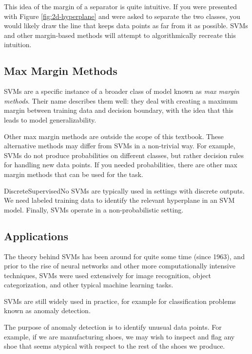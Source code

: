 This idea of the margin of a separator is quite intuitive. If you were presented with Figure \ref{fig:2d-hyperplane} and were asked to separate the two classes, you would likely draw the line that keeps data points as far from it as possible. SVMs and other margin-based methods will attempt to algorithmically recreate this intuition.

\subsection{Max Margin Methods}
SVMs are a specific instance of a broader class of model known as \textit{max margin methods}. Their name describes them well: they deal with creating a maximum margin between training data and decision boundary, with the idea that this leads to model generalizability. 

Other max margin methods are outside the scope of this textbook. These alternative methods may differ from SVMs in a non-trivial way. For example, SVMs do not produce probabilities  on different classes, but rather decision rules for handling new data points. If you needed probabilities, there are other max margin methods that can be used for the task.
%
\begin{mlcube}{Discrete}{Supervised}{No}
SVMs are typically used in settings with discrete outputs. We need labeled training data to identify the relevant hyperplane in an SVM model. Finally, SVMs operate in a non-probabilistic setting.
\end{mlcube}

\subsection{Applications}
The theory behind SVMs has been around for quite some time (since 1963), and prior to the rise of neural networks and other more computationally intensive techniques, SVMs were used extensively for image recognition, object categorization, and other typical machine learning tasks.

SVMs are still widely used in practice, for example for  classification problems known as anomaly detection.
%
\begin{warning}
    The purpose of anomaly detection is to identify unusual data points. For example, if we are manufacturing shoes, we may wish to inspect and flag any shoe that seems atypical with respect to the rest of the shoes we produce.
\end{warning}

